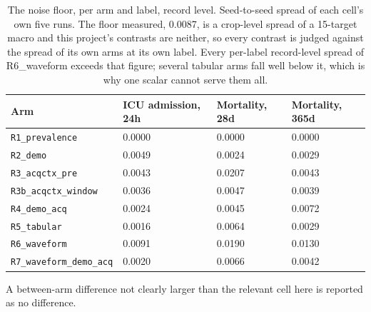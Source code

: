 \begin{table}[t]
\centering
\small
\caption{The noise floor, per arm and label, record level. Seed-to-seed spread of each cell's own five runs. The floor measured, 0.0087, is a crop-level spread of a 15-target macro and this project's contrasts are neither, so every contrast is judged against the spread of its own arms at its own label. Every per-label record-level spread of R6\_waveform exceeds that figure; several tabular arms fall well below it, which is why one scalar cannot serve them all.}
\label{tab:noise}
\begin{tabular}{llll}
\toprule
Arm & ICU admission, 24h & Mortality, 28d & Mortality, 365d \\
\midrule
\texttt{R1\_prevalence} & 0.0000 & 0.0000 & 0.0000 \\
\texttt{R2\_demo} & 0.0049 & 0.0024 & 0.0029 \\
\texttt{R3\_acqctx\_pre} & 0.0043 & 0.0207 & 0.0043 \\
\texttt{R3b\_acqctx\_window} & 0.0036 & 0.0047 & 0.0039 \\
\texttt{R4\_demo\_acq} & 0.0024 & 0.0045 & 0.0072 \\
\texttt{R5\_tabular} & 0.0016 & 0.0064 & 0.0029 \\
\texttt{R6\_waveform} & 0.0091 & 0.0190 & 0.0130 \\
\texttt{R7\_waveform\_demo\_acq} & 0.0020 & 0.0066 & 0.0042 \\
\bottomrule
\end{tabular}
\par\footnotesize A between-arm difference not clearly larger than the relevant cell here is reported as no difference.
\end{table}

